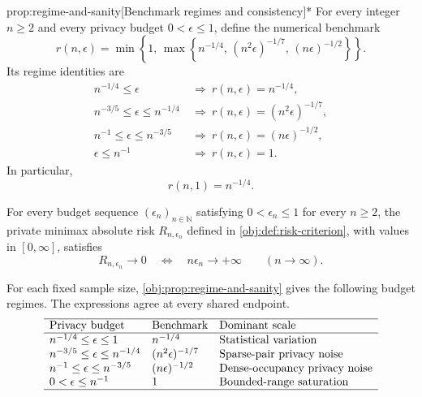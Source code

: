 \documentclass[11pt]{article}
\begin{document}
\begin{propositionv}{prop:regime-and-sanity}[Benchmark regimes and consistency]*
For every integer \(n\ge2\) and every privacy budget \(0<\epsilon\le1\), define the numerical benchmark
\[
r(n,\epsilon)
=
\min\left\{1,\,
\max\left\{
n^{-1/4},\,
(n^2\epsilon)^{-1/7},\,
(n\epsilon)^{-1/2}
\right\}\right\}.
\]
Its regime identities are
\[
\begin{aligned}
n^{-1/4}\le\epsilon
&\ \Longrightarrow\ r(n,\epsilon)=n^{-1/4},\\
n^{-3/5}\le\epsilon\le n^{-1/4}
&\ \Longrightarrow\ r(n,\epsilon)=(n^2\epsilon)^{-1/7},\\
n^{-1}\le\epsilon\le n^{-3/5}
&\ \Longrightarrow\ r(n,\epsilon)=(n\epsilon)^{-1/2},\\
\epsilon\le n^{-1}
&\ \Longrightarrow\ r(n,\epsilon)=1.
\end{aligned}
\]
In particular,
\[
r(n,1)=n^{-1/4}.
\]

For every budget sequence \((\epsilon_n)_{n\in\mathbb N}\) satisfying \(0<\epsilon_n\le1\) for every \(n\ge2\), the private minimax absolute risk \(R_{n,\epsilon_n}\) defined in \cref{obj:def:risk-criterion}, with values in \([0,\infty]\), satisfies
\[
R_{n,\epsilon_n}\longrightarrow0
\quad\Longleftrightarrow\quad
n\epsilon_n\longrightarrow+\infty
\qquad(n\to\infty).
\]
\end{propositionv}

For each fixed sample size, \cref{obj:prop:regime-and-sanity} gives the following budget regimes. The expressions agree at every shared endpoint.
\[
\begin{array}{lll}
\hline
\text{Privacy budget} & \text{Benchmark} & \text{Dominant scale}\\
\hline
n^{-1/4}\le\epsilon\le1
& n^{-1/4}
& \text{Statistical variation}\\
n^{-3/5}\le\epsilon\le n^{-1/4}
& (n^2\epsilon)^{-1/7}
& \text{Sparse-pair privacy noise}\\
n^{-1}\le\epsilon\le n^{-3/5}
& (n\epsilon)^{-1/2}
& \text{Dense-occupancy privacy noise}\\
0<\epsilon\le n^{-1}
& 1
& \text{Bounded-range saturation}\\
\hline
\end{array}
\]
\end{document}
